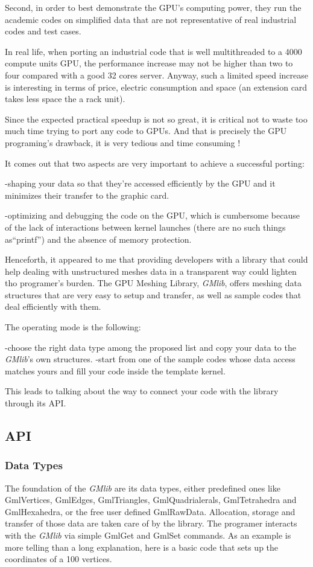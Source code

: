 \documentclass[a4paper,12pt]{article}
\begin{document}
Second, in order to best demonstrate the GPU's computing power, they run the academic codes on simplified data that are not representative of real industrial codes and test cases.

In real life, when porting an industrial code that is well multithreaded to a 4000 compute units GPU, the performance increase may not be higher than two to four compared with a good 32 cores server. Anyway, such a limited speed increase is interesting in terms of price, electric consumption and space (an extension card takes less space the a rack unit).

Since the expected practical speedup is not so great, it is critical not to waste too much time trying to port any code to GPUs. And that is precisely the GPU programing's drawback, it is very tedious and time consuming !

It comes out that two aspects are very important to achieve a successful porting:

-shaping your data so that they're accessed efficiently by the GPU and it minimizes their transfer to the graphic card.

-optimizing and debugging the code on the GPU, which is cumbersome because of the lack of interactions between kernel launches (there are no such things as``printf'') and the absence of memory protection.

Henceforth, it appeared to me that providing developers with a library that could help dealing with unstructured meshes data in a transparent way could lighten tho programer's burden. The GPU Meshing Library, \emph{GMlib}, offers meshing data structures that are very easy to setup and transfer, as well as sample codes that deal efficiently with them.

The operating mode is the following:

-choose the right data type among the proposed list and copy your data to the \emph{GMlib}'s own structures.
-start from one of the sample codes whose data access matches yours and fill your code inside the template kernel.

This leads to talking about the way to connect your code with the library through its API.


\subsection{API}

\subsubsection*{Data Types}
The foundation of the \emph{GMlib} are its data types, either predefined ones like GmlVertices, GmlEdges, GmlTriangles, GmlQuadrialerals, GmlTetrahedra and GmlHexahedra, or the free user defined GmlRawData. Allocation, storage and transfer of those data are taken care of by the library. The programer interacts with the \emph{GMlib} via simple GmlGet and GmlSet commands. As an example is more telling than a long explanation, here is a basic code that sets up the coordinates of a 100 vertices.
\end{document}
